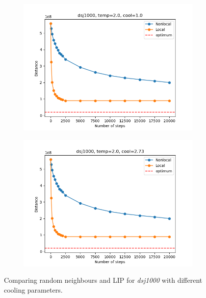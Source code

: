 \begin{figure}[!htb]
	\centering
	\begin{subfigure}{0.45\textwidth}
		\includegraphics[width=\textwidth]{img/dsj1000_temp=2.0_cool=1.0}
	\end{subfigure}
	\begin{subfigure}{0.45\textwidth}
		\includegraphics[width=\textwidth]{img/dsj1000_temp=2.0_cool=2.73}
	\end{subfigure}
	\caption{Comparing random neighbours and LIP for \textit{dsj1000} with different cooling parameters.}
	\label{fig:dsj1000_comp}
\end{figure}